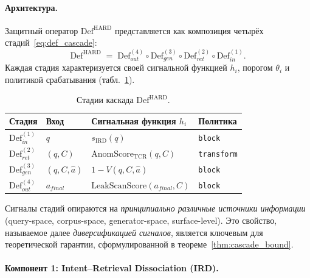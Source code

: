 \documentclass[12pt, a4paper]{article}
\theoremstyle{definition}
\theoremstyle{remark}
\begin{document}
\paragraph{Архитектура.}
Защитный оператор $\mathrm{Def}^{\text{HARD}}$ представляется как композиция четырёх стадий~\eqref{eq:def_cascade}:
\begin{equation}
    \mathrm{Def}^{\text{HARD}} \;=\;
    \mathrm{Def}_{out}^{(4)} \circ
    \mathrm{Def}_{gen}^{(3)} \circ
    \mathrm{Def}_{ret}^{(2)} \circ
    \mathrm{Def}_{in}^{(1)}.
\end{equation}
Каждая стадия характеризуется своей сигнальной функцией $h_i$, порогом $\theta_i$ и политикой срабатывания (табл.~\ref{tab:hard_stages}).

\begin{table}[H]
\centering
\caption{Стадии каскада $\mathrm{Def}^{\text{HARD}}$.}
\label{tab:hard_stages}
\begin{tabular}{|l|l|l|l|}
\hline
\textbf{Стадия} & \textbf{Вход} & \textbf{Сигнальная функция $h_i$} & \textbf{Политика} \\
\hline
$\mathrm{Def}_{in}^{(1)}$   & $q$               & $s_{\text{IRD}}(q)$                                                       & \texttt{block}     \\
$\mathrm{Def}_{ret}^{(2)}$  & $(q, C)$          & $\mathrm{AnomScore}_{\text{TCR}}(q, C)$                                  & \texttt{transform} \\
$\mathrm{Def}_{gen}^{(3)}$  & $(q, C, \hat{a})$ & $1 - V(q, C, \hat{a})$                                                   & \texttt{block}     \\
$\mathrm{Def}_{out}^{(4)}$  & $a_{final}$       & $\mathrm{LeakScanScore}(a_{final}, C)$                                   & \texttt{block}     \\
\hline
\end{tabular}
\end{table}

Сигналы стадий опираются на \textit{принципиально различные источники информации} (query-space, corpus-space, generator-space, surface-level). Это свойство, называемое далее \textit{диверсификацией сигналов}, является ключевым для теоретической гарантии, сформулированной в теореме~\ref{thm:cascade_bound}.

\paragraph{Компонент 1: Intent--Retrieval Dissociation (IRD).}
\end{document}
